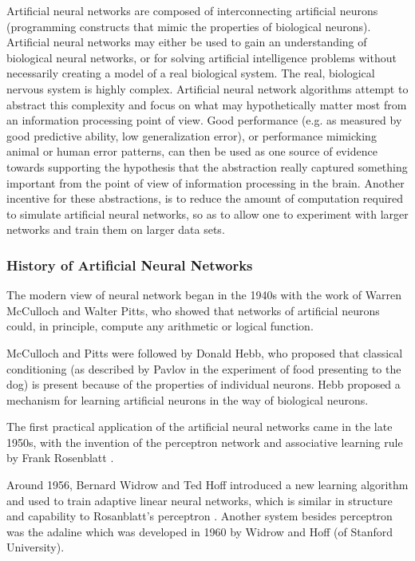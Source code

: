 Artificial neural networks are composed of interconnecting artificial neurons (programming constructs that mimic the properties of biological neurons). Artificial neural networks may either be used to gain an understanding of biological neural networks, or for solving artificial intelligence problems without necessarily creating a model of a real biological system. The real, biological nervous system is highly complex. Artificial neural network algorithms attempt to abstract this complexity and focus on what may hypothetically matter most from an information processing point of view. Good performance (e.g. as measured by good predictive ability, low generalization error), or performance mimicking animal or human error patterns, can then be used as one source of evidence towards supporting the hypothesis that the abstraction really captured something important from the point of view of information processing in the brain. Another incentive for these abstractions, is to reduce the amount of computation required to simulate artificial neural networks, so as to allow one to experiment with larger networks and train them on larger data sets.

\subsubsection{History of Artificial Neural Networks}
The modern view of neural network began in the 1940s with the work of Warren McCulloch and Walter Pitts, who showed that networks of artificial neurons could, in principle, compute any arithmetic or logical function.

McCulloch and Pitts were followed by Donald Hebb, who proposed that classical conditioning (as described by Pavlov in the experiment of food presenting to the dog) is present because of the properties of individual neurons. Hebb proposed a mechanism for learning artificial neurons in the way of biological neurons.

The first practical application of the artificial neural networks came in the late 1950s, with the invention of the perceptron network and associative learning rule by Frank Rosenblatt \cite{Haykin1999} .

Around 1956, Bernard Widrow and Ted Hoff introduced a new learning algorithm and used to train adaptive linear neural networks, which is similar in structure and capability to Rosanblatt’s perceptron \cite{Hagan1996} . Another system besides perceptron was the \ac{adaline} which was developed in 1960 by Widrow and Hoff (of Stanford University).

